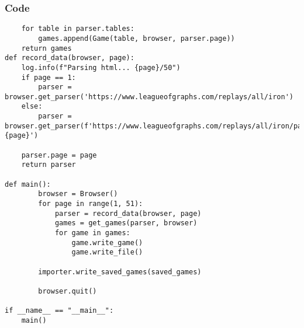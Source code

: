 \documentclass{beamer}
\begin{document}
\begin{frame}[t, fragile]
    \frametitle{Code}
    \fontsize{3pt}{5pt}\selectfont
    \begin{verbatim}
    for table in parser.tables:
        games.append(Game(table, browser, parser.page))
    return games
def record_data(browser, page):
    log.info(f"Parsing html... {page}/50")
    if page == 1:
        parser = browser.get_parser('https://www.leagueofgraphs.com/replays/all/iron')
    else:
        parser = browser.get_parser(f'https://www.leagueofgraphs.com/replays/all/iron/page-{page}')

    parser.page = page
    return parser

def main():
        browser = Browser()
        for page in range(1, 51):
            parser = record_data(browser, page)
            games = get_games(parser, browser)
            for game in games:
                game.write_game()
                game.write_file()

        importer.write_saved_games(saved_games)

        browser.quit()

if __name__ == "__main__":
    main()
    \end{verbatim}
\end{frame}

\end{document}
